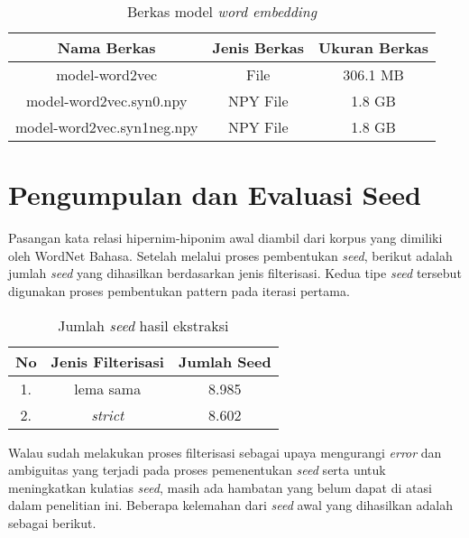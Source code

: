 \begin{table}
  \centering
    \caption{Berkas model \textit{word embedding}}
    \label{table:modelWE}
    \begin{tabular}{|c|c|c|}
      \hline
        Nama Berkas                       & Jenis Berkas & Ukuran Berkas \\ \hline
        model-word2vec                    & File         & 306.1 MB      \\ \hline
        model-word2vec.syn0.npy           & NPY File     & 1.8 GB        \\ \hline
        model-word2vec.syn1neg.npy        & NPY File     & 1.8 GB        \\ \hline
    \end{tabular}
\end{table}

\section{Pengumpulan dan Evaluasi Seed}
\label{bab-pengumpulanseed}
Pasangan kata relasi hipernim-hiponim awal diambil dari korpus yang dimiliki oleh WordNet Bahasa. Setelah melalui proses pembentukan \textit{seed}, berikut adalah jumlah \textit{seed} yang dihasilkan berdasarkan jenis filterisasi. Kedua tipe \textit{seed} tersebut digunakan proses pembentukan pattern pada iterasi pertama. 

\begin{table}
  \centering
    \caption{Jumlah \textit{seed} hasil ekstraksi}
      \label{table:jumlahSeed}
      \begin{tabular}{|c|c|c|}
        \hline
          No & Jenis Filterisasi & Jumlah Seed \\ \hline
          1. & lema sama         & 8.985       \\ \hline
          2. & \textit{strict}   & 8.602       \\ \hline
    \end{tabular}
\end{table}

Walau sudah melakukan proses filterisasi sebagai upaya mengurangi \textit{error} dan ambiguitas yang terjadi pada proses pemenentukan \textit{seed} serta untuk meningkatkan kulatias \textit{seed}, masih ada hambatan yang belum dapat di atasi dalam penelitian ini. Beberapa kelemahan dari \textit{seed} awal yang dihasilkan adalah sebagai berikut.

